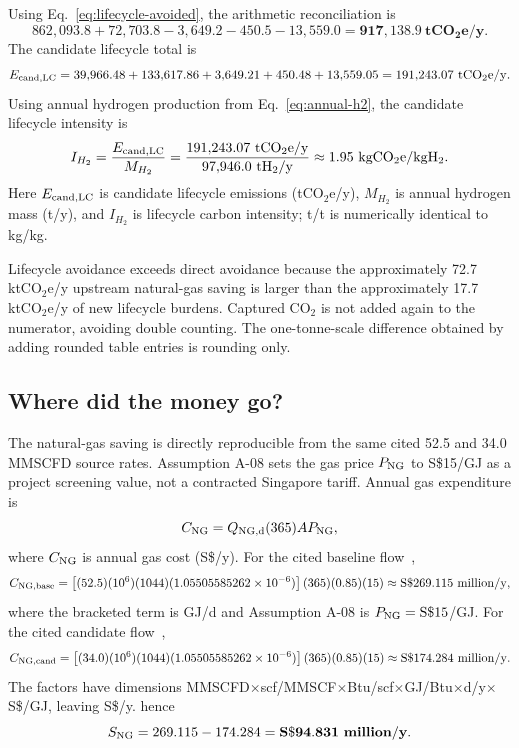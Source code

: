 Using Eq.~\ref{eq:lifecycle-avoided}, the arithmetic reconciliation is
\begin{equation}\label{eq:lifecycle-reconciliation}
862{,}093.8+72{,}703.8-3{,}649.2-450.5-13{,}559.0
=\mathbf{917{,}138.9~tCO_2e/y}.
\end{equation}
The candidate lifecycle total is
\begin{equation}\label{eq:candidate-lifecycle-total}
E_{\rm cand,LC}=39{,}966.48+133{,}617.86+3{,}649.21+450.48+13{,}559.05
=191{,}243.07~\mathrm{tCO_2e/y}.
\end{equation}
Using annual hydrogen production from Eq.~\ref{eq:annual-h2}, the candidate lifecycle intensity is
\begin{equation}\label{eq:lifecycle-intensity}
I_{H_2}=\frac{E_{\rm cand,LC}}{M_{H_2}}
=\frac{191{,}243.07~\mathrm{tCO_2e/y}}{97{,}946.0~\mathrm{tH_2/y}}
\approx1.95~\mathrm{kgCO_2e/kgH_2}.
\end{equation}
Here $E_{\rm cand,LC}$ is candidate lifecycle emissions (tCO$_2$e/y), $M_{H_2}$ is annual hydrogen mass (t/y), and $I_{H_2}$ is lifecycle carbon intensity; t/t is numerically identical to kg/kg.

Lifecycle avoidance exceeds direct avoidance because the approximately 72.7 ktCO$_2$e/y upstream natural-gas saving is larger than the approximately 17.7 ktCO$_2$e/y of new lifecycle burdens. Captured CO$_2$ is not added again to the numerator, avoiding double counting.  The one-tonne-scale difference obtained by adding rounded table entries is rounding only.

\subsection{Where did the money go?}
The natural-gas saving is directly reproducible from the same cited 52.5 and 34.0 MMSCFD source rates. Assumption A-08 sets the gas price $P_{\rm NG}$ to S\$15/GJ as a project screening value, not a contracted Singapore tariff. Annual gas expenditure is
\begin{equation}\label{eq:ng-cost-general}
C_{\rm NG}=Q_{\rm NG,d}(365)A P_{\rm NG},
\end{equation}
where $C_{\rm NG}$ is annual gas cost (S\$/y). For the cited baseline flow~\cite{inltev953},
\begin{equation}\label{eq:ng-cost-base}
C_{\rm NG,base}
=\left[(52.5)(10^6)(1044)(1.05505585262\times10^{-6})\right]
(365)(0.85)(15)
\approx\mathrm{S\$}269.115~\mathrm{million/y},
\end{equation}
where the bracketed term is GJ/d and Assumption A-08 is $P_{\rm NG}=\mathrm{S\$}15$/GJ. For the cited candidate flow~\cite{inltev961},
\begin{equation}\label{eq:ng-cost-candidate}
C_{\rm NG,cand}
=\left[(34.0)(10^6)(1044)(1.05505585262\times10^{-6})\right]
(365)(0.85)(15)
\approx\mathrm{S\$}174.284~\mathrm{million/y}.
\end{equation}
The factors have dimensions MMSCFD$\times$scf/MMSCF$\times$Btu/scf$\times$GJ/Btu$\times$d/y$\times$S\$/GJ, leaving S\$/y.
hence
\begin{equation}\label{eq:ng-saving}
S_{\rm NG}=269.115-174.284
=\mathbf{S\$94.831~million/y}.
\end{equation}


